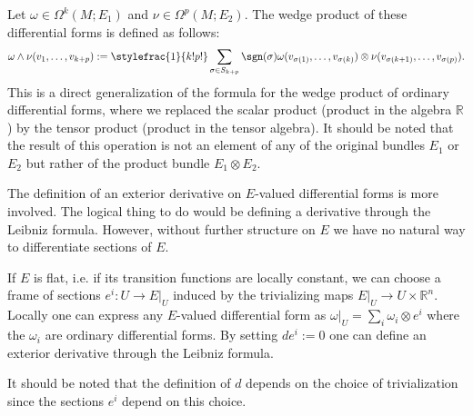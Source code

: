     \begin{construct}
        Let $\omega\in\Omega^k(M; E_1)$ and $\nu\in\Omega^p(M; E_2)$. The wedge product of these differential forms is defined as follows:
        \begin{gather}
            \label{forms:vector_valued_wedge}
            \omega\wedge\nu(v_1,\dots,v_{k+p}) := \stylefrac{1}{k!p!}\sum_{\sigma\in S_{k+p}}\sgn(\sigma)\omega(v_{\sigma(1)},\ldots, v_{\sigma(k)})\otimes\nu(v_{\sigma(k+1)},\ldots,v_{\sigma(p)}).
        \end{gather}
        This is a direct generalization of the formula for the wedge product of ordinary differential forms, where we replaced the scalar product (product in the algebra $\mathbb{R}$) by the tensor product (product in the tensor algebra). It should be noted that the result of this operation is not an element of any of the original bundles $E_1$ or $E_2$ but rather of the product bundle $E_1\otimes E_2$.
    \end{construct}

    \begin{construct}\label{diff:twisted_differential}
        The definition of an exterior derivative on $E$-valued differential forms is more involved. The logical thing to do would be defining a derivative through the Leibniz formula. However, without further structure on $E$ we have no natural way to differentiate sections of $E$.

        If $E$ is flat, i.e. if its transition functions are locally constant, we can choose a frame of sections $e^i:U\rightarrow E|_U$ induced by the trivializing maps $E|_U\rightarrow U\times\mathbb{R}^n$. Locally one can express any $E$-valued differential form as $\omega|_U=\sum_i\omega_i\otimes e^i$ where the $\omega_i$ are ordinary differential forms. By setting $de^i:=0$ one can define an exterior derivative through the Leibniz formula.
    \end{construct}
    \begin{remark}
        It should be noted that the definition of $d$ depends on the choice of trivialization since the sections $e^i$ depend on this choice.
    \end{remark}


